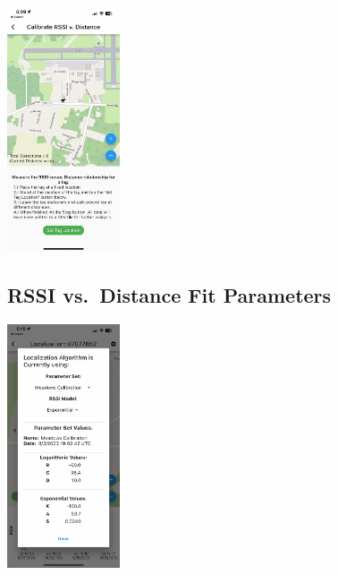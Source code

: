 \documentclass[
]{article}
\begin{document}
\includegraphics[width=0.25\textwidth,height=\textheight]{./images/sidekick_calibrateTag.PNG}

\hypertarget{rssi-vs.-distance-fit-parameters}{%
\subsection{RSSI vs.~Distance Fit
Parameters}\label{rssi-vs.-distance-fit-parameters}}

\includegraphics[width=0.25\textwidth,height=\textheight]{./images/sk_localization_choose_alg.PNG}
\end{document}
